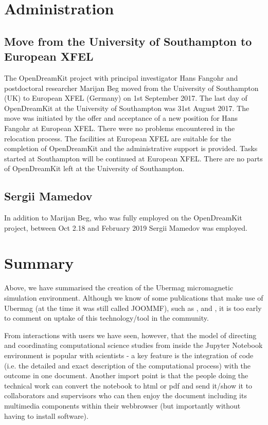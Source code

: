 \documentclass{deliverablereport}
\begin{document}
\section{Administration}

\subsection{Move from the University of Southampton to European XFEL}

The OpenDreamKit project with principal investigator Hans Fangohr and
postdoctoral researcher Marijan Beg moved from the University of
Southampton (UK) to European XFEL (Germany) on 1st September 2017. The
last day of OpenDreamKit at the University of Southampton was 31st
August 2017. The move was initiated by the offer and acceptance of a
new position for Hans Fangohr at European XFEL. There were no problems
encountered in the relocation process. The facilities at European XFEL
are suitable for the completion of OpenDreamKit and the administrative
support is provided. Tasks started at Southampton will be continued at
European XFEL. There are no parts of OpenDreamKit left at the
University of Southampton.

\subsection{Sergii Mamedov}

In addition to Marijan Beg, who was fully employed on the OpenDreamKit
project, between Oct 2.18 and February 2019 Sergii Mamedov was
employed.

\section{Summary}

Above, we have summarised the creation of the Ubermag micromagnetic
simulation environment. Although we know of some publications that
make use of Ubermag (at the time it was still called JOOMMF), such as
 \cite{Cortes2018}, \cite{Gilbert2019} and \cite{Kannan2019}, it is too
early to comment on uptake of this technology/tool in the community.

From interactions with users we have seen, however, that the model of
directing and coordinating computational science studies from inside
the Jupyter Notebook environment is popular with scientists - a key
feature is the integration of code (i.e. the detailed and exact
description of the computational process) with the outcome in one
document. Another import point is that the people doing the technical
work can convert the notebook to html or pdf and send it/show it to
collaborators and supervisors who can then enjoy the document
including its multimedia components within their webbrowser (but
importantly without having to install software).
\end{document}

